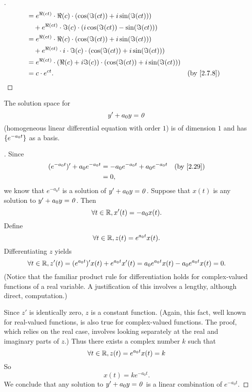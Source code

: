 \begin{proof}[]
\begin{align*}
		      & = e^{\Re(ct)} \cdot \Re(c) \cdot (\cos(\Im(ct)) + i \sin(\Im(ct)))                                          \\
		      & \quad + e^{\Re(ct)} \cdot \Im(c) \cdot (i \cos(\Im(ct)) - \sin(\Im(ct)))                                    \\
		      & = e^{\Re(ct)} \cdot \Re(c) \cdot (\cos(\Im(ct)) + i \sin(\Im(ct)))                                          \\
		      & \quad + e^{\Re(ct)} \cdot i \cdot \Im(c) \cdot (\cos(\Im(ct)) + i \sin(\Im(ct)))                            \\
		      & = e^{\Re(ct)} \cdot (\Re(c) + i \Im(c)) \cdot (\cos(\Im(ct)) + i \sin(\Im(ct)))                             \\
		      & = c \cdot e^{ct}.                                                                 &  & \by{2.7.8}
	\end{align*}
\end{proof}

\begin{thm}\label{2.30}
	The solution space for
	\[
		y' + a_0 y = \mathit{0}
	\]
	(homogeneous linear differential equation with order \(1\)) is of dimension \(1\) and has \(\left\lbrace e^{-a_0 t}\right\rbrace\) as a basis.
\end{thm}

\begin{proof}[]
	Since
	\begin{align*}
		(e^{-a_0 t})' + a_0 e^{-a_0 t} & = -a_0 e^{-a_0 t} + a_0 e^{-a_0 t} &  & \by{2.29} \\
		                               & = 0,
	\end{align*}
	we know that \(e^{-a_0 t}\) is a solution of \(y' + a_0 y = \mathit{0}\).
	Suppose that \(x(t)\) is any solution to \(y' + a_0 y = \mathit{0}\).
	Then
	\[
		\forall t \in \mathbb{R}, x'(t) = -a_0 x(t).
	\]
	Define
	\[
		\forall t \in \mathbb{R}, z(t) = e^{a_0 t} x(t).
	\]
	Differentiating \(z\) yields
	\[
		\forall t \in \mathbb{R}, z'(t) = (e^{a_0 t})' x(t) + e^{a_0 t} x'(t) = a_0 e^{a_0 t} x(t) - a_0 e^{a_0 t} x(t) = 0.
	\]
	(Notice that the familiar product rule for differentiation holds for complex-valued functions of a real variable.
	A justification of this involves a lengthy, although direct, computation.)

	Since \(z'\) is identically zero, \(z\) is a constant function.
	(Again, this fact, well known for real-valued functions, is also true for complex-valued functions.
	The proof, which relies on the real case, involves looking separately at the real and imaginary parts of \(z\).)
	Thus there exists a complex number \(k\) such that
	\[
		\forall t \in \mathbb{R}, z(t) = e^{a_0 t} x(t) = k
	\]
	So
	\[
		x(t) = k e^{-a_0 t}.
	\]
	We conclude that any solution to \(y' + a_0 y = \mathit{0}\) is a linear combination of \(e^{-a_0 t}\).
\end{proof}

